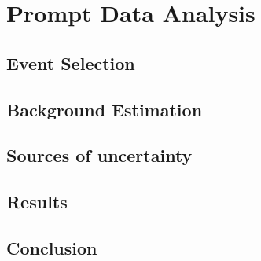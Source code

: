 \chapter{Prompt Data Analysis}

\section{Event Selection}

\section{Background Estimation}

\section{Sources of uncertainty}

\section{Results}

\section{Conclusion}

